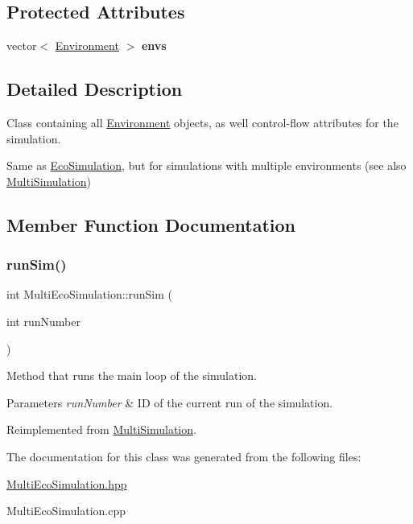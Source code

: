 \subsection*{Protected Attributes}
\begin{DoxyCompactItemize}
\item 
\mbox{\label{classMultiEcoSimulation_ad3c5ac5fa8139145d797d0f47653838e}} 
vector$<$ \hyperlink{classEnvironment}{Environment} $>$ {\bfseries envs}
\end{DoxyCompactItemize}


\subsection{Detailed Description}
Class containing all \hyperlink{classEnvironment}{Environment} objects, as well control-\/flow attributes for the simulation. 

Same as \hyperlink{classEcoSimulation}{Eco\+Simulation}, but for simulations with multiple environments (see also \hyperlink{classMultiSimulation}{Multi\+Simulation}) 

\subsection{Member Function Documentation}
\mbox{\label{classMultiEcoSimulation_ad490e089c083d06d80c62af9e1564ac3}} 
\subsubsection{\texorpdfstring{run\+Sim()}{runSim()}}
{\footnotesize\ttfamily int Multi\+Eco\+Simulation\+::run\+Sim (\begin{DoxyParamCaption}\item[{int}]{run\+Number }\end{DoxyParamCaption})\hspace{0.3cm}{\ttfamily [virtual]}}



Method that runs the main loop of the simulation. 


\begin{DoxyParams}{Parameters}
{\em run\+Number} & ID of the current run of the simulation. \\
\hline
\end{DoxyParams}


Reimplemented from \hyperlink{classMultiSimulation_a235347d04fd0c7e1a2e35d7a39e77583}{Multi\+Simulation}.



The documentation for this class was generated from the following files\+:\begin{DoxyCompactItemize}
\item 
\hyperlink{MultiEcoSimulation_8hpp}{Multi\+Eco\+Simulation.\+hpp}\item 
Multi\+Eco\+Simulation.\+cpp\end{DoxyCompactItemize}
